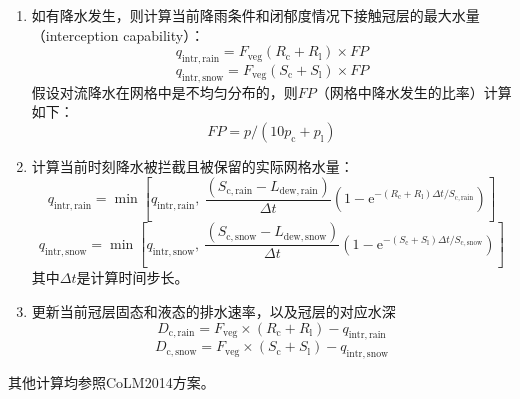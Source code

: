 \begin{enumerate}
\item 如有降水发生，则计算当前降雨条件和闭郁度情况下接触冠层的最大水量（interception capability）：
  \begin{equation}
    q_{\mathrm{intr,rain}} =F_{\mathrm{veg}}\left(R_{\mathrm{c}}+R_{\mathrm{l}}\right)\times FP
  \end{equation}
  \begin{equation}
    q_{\mathrm{intr,snow}} =F_{\mathrm{veg}}\left(S_{\mathrm{c}}+S_{\mathrm{l}}\right)\times FP
  \end{equation}
  假设对流降水在网格中是不均匀分布的，则$FP$（网格中降水发生的比率）计算如下：
  \begin{equation}
    FP = p/ (10p_{\mathrm{c}} + p_{\mathrm{l}})
  \end{equation}
\item 计算当前时刻降水被拦截且被保留的实际网格水量：
  \begin{equation}
    q_{\mathrm{intr,rain}} = \min\left[q_{\mathrm{intr,rain}}, \ \frac{(S_{\mathrm{c,rain}} - L_{\mathrm{dew,rain}})}{\Delta{t}}  (1-{\mathrm e}^{-\left(R_{\mathrm{c}}+R_{\mathrm{l}}\right)\Delta{t}/S_{\mathrm{c,rain}}})\right]
  \end{equation}
  \begin{equation}
    q_{\mathrm{intr,snow}} = \min\left[q_{\mathrm{intr,snow}},\ \frac{(S_{\mathrm{c,snow}} - L_{\mathrm{dew,snow}})}{\Delta{t}} (1-{\mathrm e}^{-\left(S_{\mathrm{c}}+S_{\mathrm{l}}\right)\Delta{t}/S_{\mathrm{c,snow}}})\right]
  \end{equation}
  其中${\Delta{t}}$是计算时间步长。
\item 更新当前冠层固态和液态的排水速率，以及冠层的对应水深
  \begin{equation}
    D_{\mathrm{c,rain}}=F_{\mathrm{veg}} \times (R_{\mathrm{c}}+R_{\mathrm{l}})-q_{\mathrm{intr,rain}}
  \end{equation}
  \begin{equation}
    D_{\mathrm{c,snow}}=F_{\mathrm{veg}} \times (S_{\mathrm{c}}+S_{\mathrm{l}})-q_{\mathrm{intr,snow}}
  \end{equation}
\end{enumerate}
其他计算均参照CoLM2014方案。


